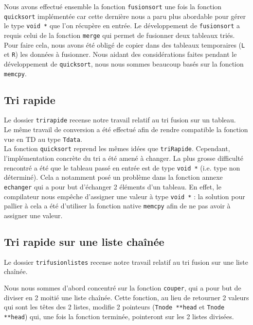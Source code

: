 \documentclass[11pt]{article}
\begin{document}
Nous avons effectué ensemble la fonction \texttt{fusionsort} une fois la fonction \texttt{quicksort} implémentée car cette dernière nous a paru plus abordable pour gérer le type \texttt{void *} que l'on récupère en entrée.
Le développement de \texttt{fusionsort} a requis celui de la fonction \texttt{merge} qui permet de fusionner deux tableaux triés. Pour faire cela, nous avons été obligé de copier dans des tableaux temporaires (\texttt{L} et \texttt{R}) les données à fusionner. Nous aidant des considérations faites pendant le développement de \texttt{quicksort}, nous nous sommes beaucoup basés sur la fonction \texttt{memcpy}.

\subsection{Tri rapide}

\quad \quad Le dossier \texttt{tri\textunderscore rapide} recense notre travail relatif au tri fusion sur un tableau. \\

Le même travail de conversion a été effectué afin de rendre compatible la fonction vue en TD au type \texttt{T\textunderscore data}. \\

La fonction \texttt{quicksort} reprend les mêmes idées que \texttt{triRapide}. Cependant, l'implémentation concrète du tri a été amené à changer. La plus grosse difficulté rencontré a été que le tableau passé en entrée est de type \texttt{void *} (i.e. type non déterminé).
Cela a notamment posé un problème dans la fonction annexe \texttt{echanger} qui a pour but d'échanger 2 éléments d'un tableau. En effet, le compilateur nous empêche d'assigner une valeur à type \texttt{void *} : la solution pour pallier à cela a été d'utiliser la fonction native \texttt{memcpy} afin de ne pas avoir à assigner une valeur. 

\subsection{Tri rapide sur une liste chaînée}

\quad \quad Le dossier \texttt{tri\textunderscore fusion\textunderscore listes} recense notre travail relatif au tri fusion sur une liste chaînée.

Nous nous sommes d'abord concentré sur la fonction \texttt{couper}, qui a pour but de diviser en 2 moitié une liste chaînée. Cette fonction, au lieu de retourner 2 valeurs qui sont les têtes des 2 listes, modifie 2 pointeurs (\texttt{T\textunderscore node **head} et \texttt{T\textunderscore node **head}) qui, une fois la fonction terminée, pointeront sur les 2 listes divisées.
\end{document}
